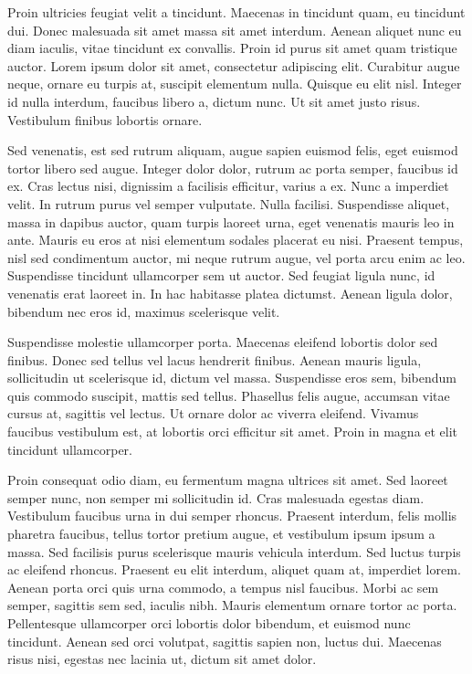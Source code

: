 \documentclass[12pt, letterpaper,twocolumn]{article}
\begin{document}
Proin ultricies feugiat velit a tincidunt. Maecenas in tincidunt quam, eu tincidunt dui. Donec malesuada sit amet massa sit amet interdum. Aenean aliquet nunc eu diam iaculis, vitae tincidunt ex convallis. Proin id purus sit amet quam tristique auctor. Lorem ipsum dolor sit amet, consectetur adipiscing elit. Curabitur augue neque, ornare eu turpis at, suscipit elementum nulla. Quisque eu elit nisl. Integer id nulla interdum, faucibus libero a, dictum nunc. Ut sit amet justo risus. Vestibulum finibus lobortis ornare.

Sed venenatis, est sed rutrum aliquam, augue sapien euismod felis, eget euismod tortor libero sed augue. Integer dolor dolor, rutrum ac porta semper, faucibus id ex. Cras lectus nisi, dignissim a facilisis efficitur, varius a ex. Nunc a imperdiet velit. In rutrum purus vel semper vulputate. Nulla facilisi. Suspendisse aliquet, massa in dapibus auctor, quam turpis laoreet urna, eget venenatis mauris leo in ante. Mauris eu eros at nisi elementum sodales placerat eu nisi. Praesent tempus, nisl sed condimentum auctor, mi neque rutrum augue, vel porta arcu enim ac leo. Suspendisse tincidunt ullamcorper sem ut auctor. Sed feugiat ligula nunc, id venenatis erat laoreet in. In hac habitasse platea dictumst. Aenean ligula dolor, bibendum nec eros id, maximus scelerisque velit.

Suspendisse molestie ullamcorper porta. Maecenas eleifend lobortis dolor sed finibus. Donec sed tellus vel lacus hendrerit finibus. Aenean mauris ligula, sollicitudin ut scelerisque id, dictum vel massa. Suspendisse eros sem, bibendum quis commodo suscipit, mattis sed tellus. Phasellus felis augue, accumsan vitae cursus at, sagittis vel lectus. Ut ornare dolor ac viverra eleifend. Vivamus faucibus vestibulum est, at lobortis orci efficitur sit amet. Proin in magna et elit tincidunt ullamcorper.

Proin consequat odio diam, eu fermentum magna ultrices sit amet. Sed laoreet semper nunc, non semper mi sollicitudin id. Cras malesuada egestas diam. Vestibulum faucibus urna in dui semper rhoncus. Praesent interdum, felis mollis pharetra faucibus, tellus tortor pretium augue, et vestibulum ipsum ipsum a massa. Sed facilisis purus scelerisque mauris vehicula interdum. Sed luctus turpis ac eleifend rhoncus. Praesent eu elit interdum, aliquet quam at, imperdiet lorem. Aenean porta orci quis urna commodo, a tempus nisl faucibus. Morbi ac sem semper, sagittis sem sed, iaculis nibh. Mauris elementum ornare tortor ac porta. Pellentesque ullamcorper orci lobortis dolor bibendum, et euismod nunc tincidunt. Aenean sed orci volutpat, sagittis sapien non, luctus dui. Maecenas risus nisi, egestas nec lacinia ut, dictum sit amet dolor.
\end{document}
